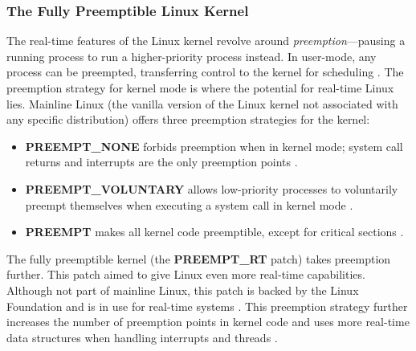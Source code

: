             \subsubsection{The Fully Preemptible Linux Kernel}
                The real-time features of the Linux kernel revolve around
                    \textit{preemption}---pausing a running process to run a
                    higher-priority process instead.
                In user-mode, any process can be preempted, transferring control
                    to the kernel for scheduling \cite{ubuntu-real-time-part2}.
                The preemption strategy for kernel mode is where the potential
                    for real-time Linux lies.
                Mainline Linux (the vanilla version of the Linux kernel not
                    associated with any specific distribution) offers three
                    preemption strategies for the kernel:
                \begin{itemize}
                    \item
                        \textbf{PREEMPT\_NONE} forbids preemption when in
                            kernel mode; system call returns and interrupts are
                            the only preemption points
                            \cite{linux-preemption-models}.
                    \item
                        \textbf{PREEMPT\_VOLUNTARY} allows low-priority
                            processes to voluntarily preempt themselves when
                            executing a system call in kernel mode
                            \cite{ubuntu-real-time-part3}.
                    \item
                        \textbf{PREEMPT} makes all kernel code preemptible,
                        except for critical sections
                        \cite{linux-preemption-models}.
                \end{itemize}

                The fully preemptible kernel (the \textbf{PREEMPT\_RT} patch)
                    takes preemption further.
                This patch aimed to give Linux even more real-time capabilities.
                Although not part of mainline Linux, this patch is backed by the
                    Linux Foundation and is in use for real-time systems
                    \cite{rt-linux-riscv}.
                This preemption strategy further increases the number of
                    preemption points in kernel code and uses more real-time
                    data structures when handling interrupts and threads
                    \cite{linux-preemption-models}.

